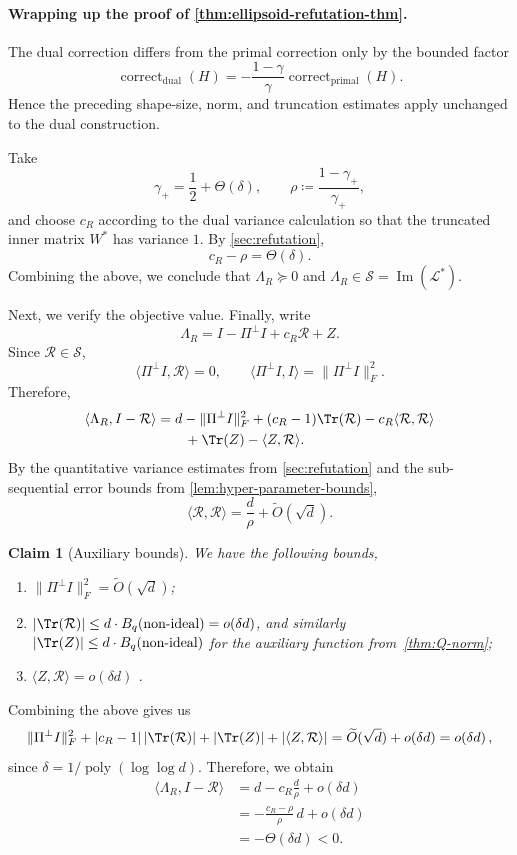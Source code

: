 \documentclass[12pt]{article}
\newtheorem{claim}[theorem]{Claim}
\newcommand{\poly}{\operatorname{poly}}
\newcommand{\calR}{\mathcal{R}}
\newcommand{\calS}{\mathcal{S}}
\newcommand{\calL}{\mathcal{L}}
\begin{document}
 \paragraph{Wrapping up the proof of
\cref{thm:ellipsoid-refutation-thm}.}
The dual correction differs from the primal correction only by the
bounded factor
\[
    \operatorname{correct}_{\mathrm{dual}}(H)
    =
    -\frac{1-\gamma}{\gamma}
    \operatorname{correct}_{\mathrm{primal}}(H).
\]
Hence the preceding shape-size, norm, and truncation estimates apply
unchanged to the dual construction.

Take
\[
    \gamma_+
    =
    \frac12+\Theta(\delta),
    \qquad
    \rho
    \coloneqq
    \frac{1-\gamma_+}{\gamma_+},
\]
and choose \(c_R\) according to the dual variance calculation so that
the truncated inner matrix \(W^\ast\) has variance \(1\). By
\cref{sec:refutation},
\[
    c_R-\rho=\Theta(\delta).
\]
Combining the above, we conclude that $\Lambda_R\succeq 0 $ and $\Lambda_R \in \calS=\operatorname{Im}(\calL^*)$.


Next, we verify the objective value. Finally, write
\[
    \Lambda_R
    =
    I-\Pi^\perp I+c_R\calR+Z.
\]
Since \(\calR\in\calS\),
\[
    \langle\Pi^\perp I,\calR\rangle=0,
    \qquad
    \langle\Pi^\perp I,I\rangle
    =
    \|\Pi^\perp I\|_F^2.
\]
Therefore,
\begin{align*}
    \langle\Lambda_R,I-\calR\rangle
    &=
    d-\|\Pi^\perp I\|_F^2
    +(c_R-1)\Tr(\calR)
    -c_R\langle\calR,\calR\rangle \\
    &\qquad
    +\Tr(Z)-\langle Z,\calR\rangle.
\end{align*}
By the quantitative variance estimates from
\cref{sec:refutation} and the sub-sequential error bounds from \cref{lem:hyper-parameter-bounds},
\[
    \langle\calR,\calR\rangle
    =
    \frac d\rho+\widetilde O(\sqrt d).
\]

\begin{claim}[Auxiliary bounds] \label{clm:refutation-aux-bounds}
	We have the following bounds, \begin{enumerate}
	\item $ \|\Pi^\perp I\|_F^2 = \tilde{O}(\sqrt{d})$;
	\item  $ |\Tr(\calR)|\leq d \cdot B_q(\text{non-ideal}) = o(\delta d)  $, and similarly $ |\Tr(Z)| \leq d \cdot  B_q(\text{non-ideal})$ for the auxiliary function from~\cref{thm:Q-norm};
	\item $ \langle Z,\calR \rangle = o(\delta d) $ .
\end{enumerate}
\end{claim}
Combining the above gives us \[
    \|\Pi^\perp I\|_F^2
    +
    |c_R-1|\,|\Tr(\calR)|
    +
    |\Tr(Z)|
    +
    |\langle Z,\calR\rangle|
    =
    \widetilde O(\sqrt d)+o(\delta d) = o(\delta d)\,,
\]
since $\delta = 1/\poly(\log \log d)$.
Therefore, we obtain
\begin{align*}
    \langle\Lambda_R,I-\calR\rangle
    &=
    d-c_R\frac d\rho+o(\delta d)\\
    &=
    -\frac{c_R-\rho}{\rho}\,d+o(\delta d)\\
    &=
    -\Theta(\delta d)<0.
\end{align*}
\end{document}
